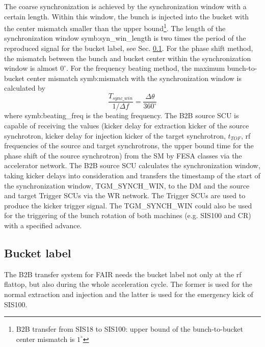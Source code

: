 The coarse synchronization is achieved by the synchronization window with a certain length. Within this window, the bunch is injected into the bucket with the center mismatch smaller than the upper bound\footnote{B2B transfer from SIS18 to SIS100: upper bound of the bunch-to-bucket center mismatch is $1^\circ$}. The length of the synchronization window \gls{symb:syn_win_length} is two times the period of the reproduced signal for the bucket label, see Sec. \ref{sec:bucket_label}. For the phase shift method, the mismatch between the bunch and bucket center within the synchronization window is almost $0^\circ$. For the frequency beating method, the maximum bunch-to-bucket center mismatch \gls{symb:mismatch} with the synchronization window is calculated by 
\begin{equation}
\frac{T_{sync\_win}}{1/\Delta f}= \frac{\Delta \theta}{360^\circ}
\end{equation}
where \gls{symb:beating_freq} is the beating frequency.
The B2B source SCU is capable of receiving the values (kicker delay for extraction kicker of the source synchrotron, kicker delay for injection kicker of the target synchrotron, $t_{TOF}$, rf frequencies of the source and target synchrotrons, the upper bound time for the phase shift of the source synchrotron) from the SM by FESA classes via the accelerator network. The B2B source SCU calculates the synchronization window, taking kicker delays into consideration and transfers the timestamp of the start of the synchronization window, TGM\_SYNCH\_WIN, to the DM and the source and target Trigger SCUs via the WR network. The Trigger SCUs are used to produce the kicker trigger signal. The TGM\_SYNCH\_WIN could also be used for the triggering of the bunch rotation of both machines (e.g. SIS100 and CR) with a specified advance. 

\subsection{Bucket label}
\label{sec:bucket_label}
The B2B transfer system for FAIR needs the bucket label not only at the rf flattop, but also during the whole acceleration cycle. The former is used for the normal extraction and injection and the latter is used for the emergency kick of SIS100. 

